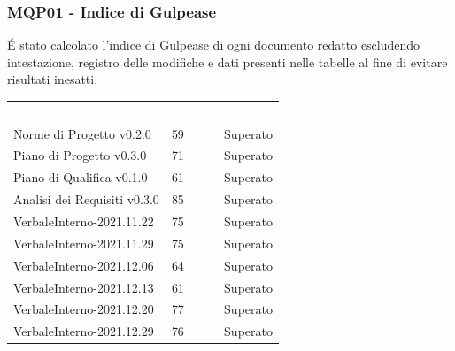 \subsubsection{MQP01 - Indice di Gulpease}
É stato calcolato l'indice di Gulpease di ogni documento redatto escludendo intestazione, registro delle modifiche e dati presenti nelle tabelle al fine di evitare risultati inesatti.
\begin{table}[H]
        \renewcommand{\arraystretch}{1.5}
        \begin{tabular}{m{}<{\centering}  m{}<{\centering}  m{}<{\centering} }
            \rowcolor{darkblue}
            \textcolor{white}{\textbf{Documento}}& \textcolor{white}{\textbf{Valore}} & \textcolor{white}{\textbf{Esito}}\\ 
            
			Norme di Progetto v0.2.0 &
            59 &
            Superato \\

            Piano di Progetto v0.3.0 &
            71 &
            Superato \\

            Piano di Qualifica v0.1.0 &
            61 &
            Superato \\

            Analisi dei Requisiti v0.3.0 &
            85 &
            Superato \\

            VerbaleInterno-2021.11.22&
            75 &
            Superato \\

            VerbaleInterno-2021.11.29&
            75 &
            Superato \\
            
            VerbaleInterno-2021.12.06&
            64 &
            Superato \\
            
            VerbaleInterno-2021.12.13&
            61 &
            Superato \\
            
            VerbaleInterno-2021.12.20&
            77 &
            Superato \\
            
            VerbaleInterno-2021.12.29&
            76 &
            Superato \\
            

\end{tabular}
\end{table}
